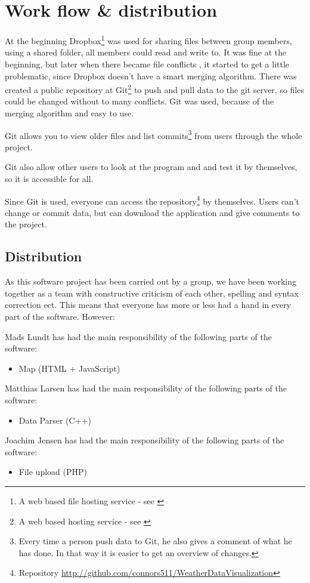 \chapter{Work flow \& distribution}
At the beginning Dropbox\footnote{A web based file hosting service - see \cite{Dropbox}} was used for sharing files between group members, using a shared folder, all members could read and write to. It was fine at the beginning, but later when there became file conflicts , it started to get a little problematic, since Dropbox doesn't have a smart merging algorithm.
There was created a public repository at Git\footnote{A web based hosting service - see \cite{Git}} to push and pull data to the git server, so files could be changed without to many conflicts. Git was used, because of the merging algorithm and easy to use.

Git allows you to view older files and list commits\footnote{Every time a person push data to Git, he also gives a comment of what he has done. In that way it is easier to get an overview of changes.} from users through the whole project.

Git also allow other users to look at the program and and test it by themselves, so it is accessible for all.

Since Git is used, everyone can access the repository\footnote{Repository \url{http://github.com/connors511/WeatherDataVisualization}} by themselves. Users can't change or commit data, but can download the application and give comments to the project.

\section{Distribution}
As this software project has been carried out by a group, we have been working together as a team with constructive criticism of each other, spelling and syntax correction ect. This means that everyone has more or less had a hand in every part of the software. However:

Mads Lundt has had the main responsibility of the following parts of the software:
\begin{itemize}
\item Map (HTML + JavaScript)
\end{itemize}

Matthias Larsen has had the main responsibility of the following parts of the software:
\begin{itemize}
\item Data Parser (C++)
\end{itemize}

Joachim Jensen has had the main responsibility of the following parts of the software:
\begin{itemize}
\item File upload (PHP)
\end{itemize}